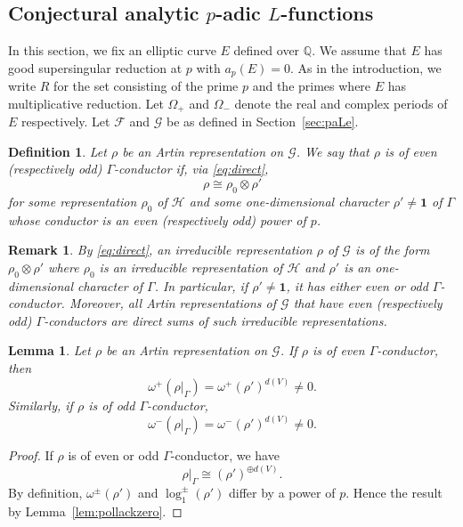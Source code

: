 \documentclass{amsart}
\newtheorem{lemma}[theorem]{Lemma}
\newtheorem{remark}[theorem]{Remark}
\newtheorem{definition}[theorem]{Definition}
\begin{document}
\subsection{Conjectural analytic $p$-adic $L$-functions}
\label{sec:con}
In this section, we fix an elliptic curve $E$ defined over ${\mathbb Q}$. We assume that $E$ has good supersingular reduction at $p$ with $a_p(E)=0$. As in the introduction, we write $R$ for the set consisting of the prime $p$ and the primes where $E$ has multiplicative reduction. Let $\Omega_+$ and $\Omega_-$ denote the real and complex periods of $E$ respectively. Let ${\mathcal{F}}$ and ${\mathcal{G}}$ be as defined in Section~\ref{sec:paLe}.  

\begin{definition}\label{def:con}
Let $\rho$ be an Artin representation on ${\mathcal{G}}$. We say that $\rho$ is of even (respectively odd) $\Gamma$-conductor if, via  \eqref{eq:direct}, 
\[
\rho\cong \rho_0\otimes\rho'
\]
 for some representation $\rho_0$ of ${\mathcal{H}}$ and some one-dimensional character $\rho'\ne\mathbf{1}$ of $\Gamma$ whose conductor is an even (respectively odd) power of $p$.
\end{definition}

\begin{remark}\label{rk:irred}
By \eqref{eq:direct}, an irreducible representation $\rho$ of ${\mathcal{G}}$ is of the form $\rho_0\otimes\rho'$ where $\rho_0$ is an irreducible representation of ${\mathcal{H}}$ and $\rho'$ is an one-dimensional character of $\Gamma$. In particular, if $\rho'\ne\mathbf{1}$, it has either even or odd $\Gamma$-conductor. Moreover, all Artin representations of ${\mathcal{G}}$ that have even (respectively odd) $\Gamma$-conductors are direct sums of such irreducible representations.
\end{remark}

\begin{lemma}\label{lem:nonzero}
Let $\rho$ be an Artin representation on ${\mathcal{G}}$. If $\rho$ is of even $\Gamma$-conductor, then
\[
\omega^+(\rho|_\Gamma)=\omega^+(\rho')^{d(V)}\ne0.
\]
Similarly, if $\rho$ is of odd $\Gamma$-conductor,
\[
\omega^-(\rho|_\Gamma)=\omega^-(\rho')^{d(V)}\ne0.
\]
\end{lemma}
\begin{proof}
If $\rho$ is of even or odd $\Gamma$-conductor, we have
\[
\rho|_\Gamma\cong(\rho')^{\oplus d(V)}.
\]
By definition, $\omega^\pm(\rho')$ and $\log_1^\pm(\rho')$ differ by a power of $p$. Hence the result by Lemma~\ref{lem:pollackzero}.
\end{proof}
\end{document}
